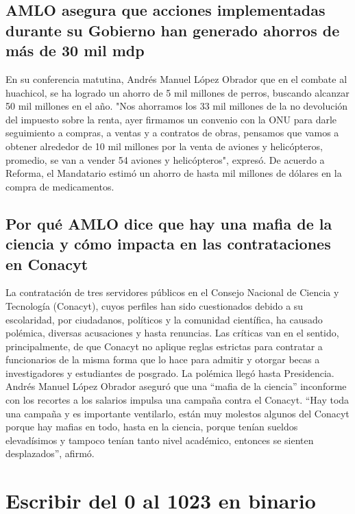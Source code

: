 \documentclass{mylib/reporte}
\begin{document}
\subsection{AMLO asegura que acciones implementadas durante su Gobierno han generado ahorros de más de 30 mil mdp}

En su conferencia matutina, Andrés Manuel López Obrador que en el combate al huachicol, se ha logrado un ahorro de 5 mil millones de perros, buscando alcanzar 50 mil millones en el año.
"Nos ahorramos los 33 mil millones de la no devolución del impuesto sobre la renta, ayer firmamos un convenio con la ONU para darle seguimiento a compras, a ventas y a contratos de obras, pensamos que vamos a obtener alrededor de 10 mil millones por la venta de aviones y helicópteros, promedio, se van a vender 54 aviones y helicópteros", expresó.
De acuerdo a Reforma, el Mandatario estimó un ahorro de hasta mil millones de dólares en la compra de medicamentos.

\subsection{Por qué AMLO dice que hay una mafia de la ciencia y cómo impacta en las contrataciones en Conacyt}

La contratación de tres servidores públicos en el Consejo Nacional de Ciencia y Tecnología (Conacyt), cuyos perfiles han sido cuestionados debido a su escolaridad, por ciudadanos, políticos y la comunidad científica, ha causado polémica, diversas acusaciones y hasta renuncias.
Las críticas van en el sentido, principalmente, de que Conacyt no aplique reglas estrictas para contratar a funcionarios de la misma forma que lo hace para admitir y otorgar becas a investigadores y estudiantes de posgrado.
La polémica llegó hasta Presidencia. Andrés Manuel López Obrador aseguró que una “mafia de la ciencia” inconforme con los recortes a los salarios impulsa una campaña contra el Conacyt.
“Hay toda una campaña y es importante ventilarlo, están muy molestos algunos del Conacyt porque hay mafias en todo, hasta en la ciencia, porque tenían sueldos elevadísimos y tampoco tenían tanto nivel académico, entonces se sienten desplazados”, afirmó.


\section{Escribir del 0 al 1023 en binario}
\end{document}
